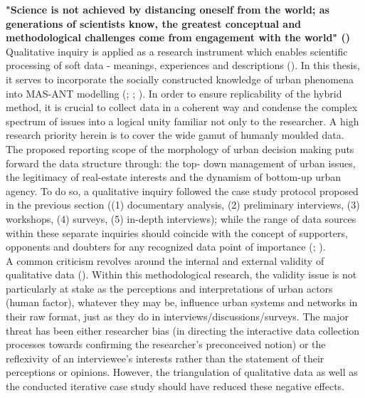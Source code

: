 \documentclass[11pt]{report}
\begin{document}
{{{{\textbf{"Science is not achieved  by distancing oneself from  the world; as  generations of scientists  know,  the greatest conceptual and methodological challenges come from  engagement with the world" (\href{Whyte}{\citealt{whyte_participatory_1991}})}
\\

Qualitative inquiry is applied as a research instrument which enables scientific processing of soft data - meanings, experiences and descriptions (\href{Yin}{\citealt{yin_case_2003}}).
In this thesis, it serves to incorporate the socially constructed knowledge of urban phenomena into MAS-ANT modelling (\href{Mertens}{\citealt{mertens_introduction_1998}}; \href{Flick}{\citealt{flick_introduction_2009}}; \href{Grubovic}{\citealt{grubovic_belgrade_2006}}).
In order to ensure replicability of the hybrid method, it is crucial to collect data in a coherent way and condense the complex spectrum of issues into a logical unity familiar not only to the researcher. A high research priority herein is to cover the wide gamut of humanly moulded data. The proposed reporting scope of the morphology of urban decision making puts forward the data structure through: the top- down management of urban issues, the legitimacy of real-estate interests and the dynamism of bottom-up urban agency. To do so, a qualitative inquiry followed the case study protocol proposed in the previous section ((1) documentary analysis, (2) preliminary interviews, (3) workshops, (4) surveys, (5) in-depth interviews); while the range of data sources within these separate inquiries should coincide with the concept of supporters, opponents and doubters for any recognized data point of importance (\href{Pettigrew}{\citealt{pettigrew_character_1992}}; \href{Harrison}{\citealt{partington_case_2002}}). 
\\

A common criticism revolves around the internal and external validity of qualitative data (\href{Flyvbjerg}{\citealt{flyvbjerg_five_2006}}). Within this methodological research, the validity issue is not particularly at stake as the perceptions and interpretations of urban actors (human factor), whatever they may be, influence urban systems and networks in their raw format, just as they do in interviews/discussions/surveys. The major threat has been either researcher bias (in directing the interactive data collection processes towards confirming the researcher’s preconceived notion) or the reflexivity of an interviewee’s interests rather than the statement of their perceptions or opinions. However, the triangulation of qualitative data as well as the conducted iterative case study should have reduced these negative effects.
\\

}}}}
\end{document}
